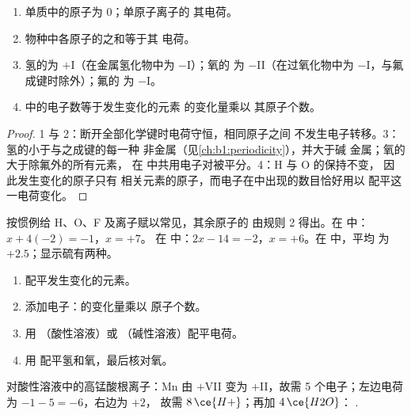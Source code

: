 \begin{proposition}[氧化数的规则]\label{prop:b1:nernst:on-rules}
\begin{enumerate}
  \item 单质中的原子为 0；单原子离子的
        其电荷。
  \item 物种中各原子的之和等于其
        电荷。
  \item 氢的为 $+$I（在金属氢化物中为 $-$I）；氧的
        为 $-$II（在过氧化物中为 $-$I，与氟成键时除外）；氟的
        为 $-$I。
  \item {}中的电子数等于发生变化的元素
        的变化量乘以
        其原子个数。
\end{enumerate}
\end{proposition}

\begin{proof}
1 与 2：断开全部化学键时电荷守恒，相同原子之间
不发生电子转移。3：氢的小于与之成键的每一种
非金属（见\cref{ch:b1:periodicity}），并大于碱
金属；氧的大于除氟外的所有元素，
在  中共用电子对被平分。4：H 与 O 的保持不变，
因此发生变化的原子只有
相关元素的原子，而电子在中出现的数目恰好用以
配平这一电荷变化。
\end{proof}

\begin{method}[物种的氧化数]\label{met:b1:nernst:oxidation-numbers}
按惯例给 H、O、F 及离子赋以常见，其余原子的
由规则 2 得出。在  中：$x + 4(-2) = -1$，$x = +7$。
在  中：$2x - 14 = -2$，$x = +6$。在  中，平均
为 $+2.5$；显示硫有两种。
\end{method}

\begin{method}[配平半反应式]\label{met:b1:nernst:balance-by-on}
\begin{enumerate}
  \item 配平发生变化的元素。
  \item 添加电子：的变化量乘以
        原子个数。
  \item 用 （酸性溶液）或 
        （碱性溶液）配平电荷。
  \item 用  配平氢和氧，最后核对氧。
\end{enumerate}
对酸性溶液中的高锰酸根离子：Mn 由 $+$VII 变为 $+$II，故需 5
个电子；左边电荷为 $-1 - 5 = -6$，右边为 $+2$，
故需 $8\,\ce{H+}$；再加 $4\,\ce{H2O}$：
.
\end{method}


